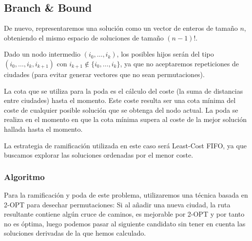 \documentclass[a4paper, 11pt]{article} %
\begin{document}
	\newpage
        \small
  	\texttt{}
        \normalsize
  

  \subsection{Branch \& Bound}
  De nuevo, representaremos una solución como un vector de enteros de tamaño $n$, obteniendo el mismo espacio de soluciones de tamaño $(n-1)!$.
  
  Dado un nodo intermedio $(i_0, \dots, i_k)$, los posibles hijos serán del tipo\\ $(i_0, \dots, i_k, i_{k+1})$ con $i_{k+1} \notin \{i_0, \dots, i_k\}$, ya que no aceptaremos repeticiones de ciudades (para evitar generar vectores que no sean permutaciones).
  
  La cota que se utiliza para la poda es el cálculo del coste (la suma de distancias entre ciudades) hasta el momento. Este coste resulta ser una cota mínima del coste de cualquier posible solución que se obtenga del nodo actual.
  La poda se realiza en el momento en que la cota mínima supera al coste de la mejor solución hallada hasta el momento.
  
  La estrategia de ramificación utilizada en este caso será Least-Cost FIFO, ya que buscamos explorar las soluciones ordenadas por el menor coste.
  
  \subsubsection{Algoritmo}
  
  Para la ramificación y poda de este problema, utilizaremos una técnica basada en 2-OPT para desechar permutaciones: Si al añadir una nueva ciudad, la ruta resultante contiene algún cruce de caminos, es mejorable por 2-OPT y por tanto no es óptima, luego podemos pasar al siguiente candidato sin tener en cuenta las soluciones derivadas de la que hemos calculado.  
  
\end{document}
